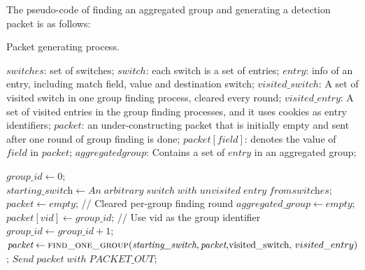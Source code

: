 The pseudo-code of finding an aggregated group and generating a detection packet is as follows:

\begin {tcolorbox}[blanker,float=tbp,
grow to left by=1cm, grow to right by=1cm]
\label{pseudo}
\begin{algorithm}[H]

  \caption{Packet generating process.}
  \begin{algorithmic}[1]
    \Require
      $switches$: set of switches;  \newline
      $switch$: each switch is a set of entries;  \newline
      $entry$: info of an entry, including match field, value and destination switch;  \newline
      $visited\_switch$: A set of visited switch in one group finding process, cleared every round;  \newline
      $visited\_entry$: A set of visited entries \sout{} in the group finding processes, and it uses cookies as entry identifiers; \newline
      $packet$: an under-constructing packet that is initially empty and sent after one round of group finding is done; \newline
      $packet[field]$: denotes the value of $field$ in $packet$; \newline
      $aggregated group$: Contains a set of $entry$ in an aggregated group; \newline

      
      \State $\textit{group\_id} \gets 0$;
            \State $\textit{starting\_switch} \gets An\;arbitrary\;switch\;with\;unvisited\;entry\;from\textit{switches}$;
            \State $\textit{packet} \gets empty$;   // Cleared per-group finding round \sout{}
            \State $\textit{aggregated\_group} \gets empty$;
            \State $packet[vid] \gets \textit{group\_id}$;   // Use vid as the group identifier 
            \State $group\_id \gets \textit{group\_id} + 1$;
            \State $\textit{packet} \gets \Call{find\_one\_group}{\textit{starting\_switch}, \textit{packet}, $visited\_switch, $visited\_entry}$;
            \State $Send\;\textit{packet}\;with\;PACKET\_OUT$;
      \EndWhile
    \EndFunction
  \end{algorithmic}
\end{algorithm}
\end{tcolorbox}

